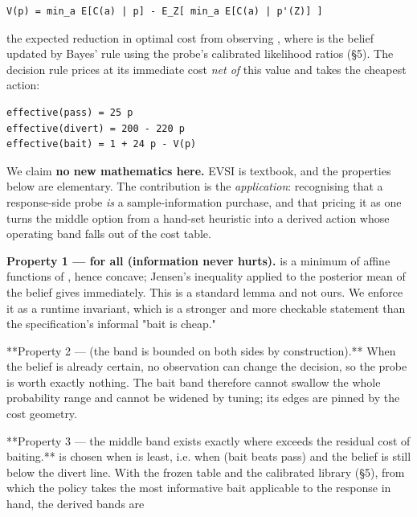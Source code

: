 \begin{lstlisting}
V(p) = min_a E[C(a) | p] - E_Z[ min_a E[C(a) | p'(Z)] ]
\end{lstlisting}


the expected reduction in optimal cost from observing , where  is the
belief updated by Bayes' rule using the probe's calibrated likelihood ratios
(\S5). The decision rule prices  at its immediate cost \emph{net of} this value
and takes the cheapest action:

\begin{lstlisting}
effective(pass) = 25 p
effective(divert) = 200 - 220 p
effective(bait) = 1 + 24 p - V(p)
\end{lstlisting}


We claim \textbf{no new mathematics here.} EVSI is textbook, and the properties below
are elementary. The contribution is the \emph{application}: recognising that a
response-side probe \emph{is} a sample-information purchase, and that pricing it as one
turns the middle option from a hand-set heuristic into a derived action whose
operating band falls out of the cost table.

\textbf{Property 1 ---  for all  (information never hurts).}
 is a minimum of affine functions of , hence concave;
Jensen's inequality applied to the posterior mean of the belief gives
 immediately. This is a standard lemma and not
ours. We enforce it as a runtime invariant, which is a stronger
and more checkable statement than the specification's informal "bait is cheap."

**Property 2 ---  (the band is bounded on both sides by
construction).** When the belief is already certain, no observation can change the
decision, so the probe is worth exactly nothing. The bait band therefore cannot
swallow the whole probability range and cannot be widened by tuning; its edges are
pinned by the cost geometry.

**Property 3 --- the middle band exists exactly where  exceeds the residual
cost of baiting.**  is chosen when  is least, i.e. when
 (bait beats pass) and the belief is still below the divert line.
With the frozen table and the calibrated library (\S5), from which the policy takes
the most informative bait applicable to the response in hand, the derived bands are

